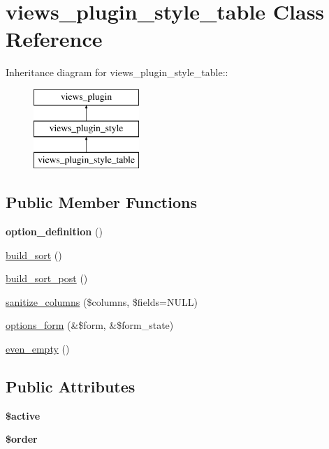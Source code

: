 \hypertarget{classviews__plugin__style__table}{
\section{views\_\-plugin\_\-style\_\-table Class Reference}
\label{classviews__plugin__style__table}
}
Inheritance diagram for views\_\-plugin\_\-style\_\-table::\begin{figure}[H]
\begin{center}
\leavevmode
\includegraphics[height=3cm]{classviews__plugin__style__table}
\end{center}
\end{figure}
\subsection*{Public Member Functions}
\begin{DoxyCompactItemize}
\item 
\hypertarget{classviews__plugin__style__table_ae3d77e484f3e8ff4e2df07dfcfc44aab}{
{\bfseries option\_\-definition} ()}
\label{classviews__plugin__style__table_ae3d77e484f3e8ff4e2df07dfcfc44aab}

\item 
\hyperlink{classviews__plugin__style__table_a3bc31ba52d980f899307aee2d74bef58}{build\_\-sort} ()
\item 
\hyperlink{classviews__plugin__style__table_a00d9e14ac7f545d47a43af3f9d186382}{build\_\-sort\_\-post} ()
\item 
\hyperlink{classviews__plugin__style__table_a1ab90a2782f6061d998a6db033100fdc}{sanitize\_\-columns} (\$columns, \$fields=NULL)
\item 
\hyperlink{classviews__plugin__style__table_a732752fb9b74bdb48673cb9ff4150be9}{options\_\-form} (\&\$form, \&\$form\_\-state)
\item 
\hyperlink{classviews__plugin__style__table_a6c1b6a4ddba95e72a3cc2dee0af9b92c}{even\_\-empty} ()
\end{DoxyCompactItemize}
\subsection*{Public Attributes}
\begin{DoxyCompactItemize}
\item 
\hypertarget{classviews__plugin__style__table_a60e09b539fd043999a34c3f798a3a433}{
{\bfseries \$active}}
\label{classviews__plugin__style__table_a60e09b539fd043999a34c3f798a3a433}

\item 
\hypertarget{classviews__plugin__style__table_a768cbd6000591bf86794c1a59a22320b}{
{\bfseries \$order}}
\label{classviews__plugin__style__table_a768cbd6000591bf86794c1a59a22320b}

\end{DoxyCompactItemize}


